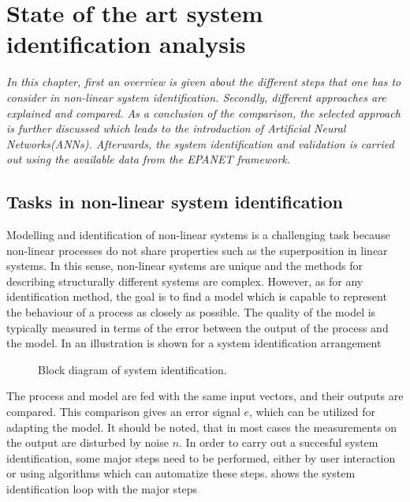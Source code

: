 \chapter{State of the art system identification analysis}
\label{identification_methods}

\emph{In this chapter, first an overview is given about the different steps that one has to consider in non-linear system identification. Secondly, different approaches are explained and compared. As a conclusion of the comparison, the selected approach is further discussed which leads to the introduction of Artificial Neural Networks(ANNs). Afterwards, the system identification and validation is carried out using the available data from the EPANET framework.}

\section{Tasks in non-linear system identification}
\label{tasks_nonlinear_sys_identification}

Modelling and identification of non-linear systems is a challenging task because non-linear processes do not share properties such as the superposition in linear systems. In this sense, non-linear systems are unique and the methods for describing structurally different systems are complex. However, as for any identification method, the goal is to find a model which is capable to represent the behaviour of a process as closely as possible. The quality of the model is typically measured in terms of the error between the output of the process and the model. In  an illustration is shown for a system identification arrangement 
\vspace{-3mm}
\begin{figure}[H]
\centering
 
\vspace{-3mm}
\caption{Block diagram of system identification.}
\label{fig:nonlin_block}
\end{figure}

\vspace{-4mm}

The process and model are fed with the same input vectors, and their outputs are compared. This comparison gives an error signal $e$, which can be utilized for adapting the model. It should be noted, that in most cases the measurements on the output are disturbed by noise $n$. In order to carry out a succesful system identification, some major steps need to be performed, either by user interaction or using algorithms which can automatize these steps.  shows the system identification loop with the major steps

